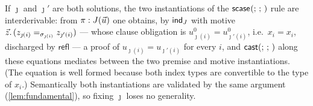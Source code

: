 \begin{remark}
\label{rem:solution-choice}
If $\jmath$ and $\jmath'$ are both solutions, the two instantiations of
the $\mathsf{scase}_{}(;\,;\,)$ rule are interderivable: from $\pi : J(\vec{u})$
one obtains, by $\mathsf{ind}_{J}$ with motive $\vec{z}.\,(z_{\jmath(i)}
=_{\sigma_{\jmath(i)}} z_{\jmath'(i)})$ --- whose clause obligation is
$u^0_{\jmath(i)} = u^0_{\jmath'(i)}$, i.e.\ $x_i = x_i$, discharged by
$\mathsf{refl}$ --- a proof of $u_{\jmath(i)} = u_{\jmath'(i)}$ for
every $i$, and $\mathsf{cast}(;\,;\,)$ along these equations mediates between
the two premise and motive instantiations.  (The equation is well
formed because both index types are convertible to the type of $x_i$.)
Semantically both instantiations are validated by the same argument
(\cref{lem:fundamental}), so fixing $\jmath$ loses no generality.
\end{remark}

